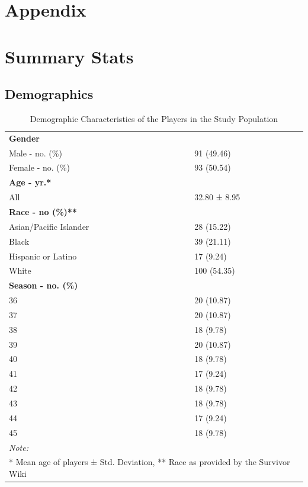 \documentclass[
  letterpaper,
  DIV=11,
  numbers=noendperiod,
  oneside]{scrartcl}
\begin{document}
\hypertarget{appendix}{%
\section{Appendix}\label{appendix}}

\hypertarget{summary-stats}{%
\section{Summary Stats}\label{summary-stats}}

\hypertarget{demographics}{%
\subsection{Demographics}\label{demographics}}

\hypertarget{tbl-summary-stats}{}
\begin{table}
\caption{\label{tbl-summary-stats}Demographic Characteristics of the Players in the Study Population }\tabularnewline

\centering
\begin{tabular}[t]{l|l}
\hline
\cellcolor{black}{\textcolor{white}{\textbf{Characteristic}}} & \cellcolor{black}{\textcolor{white}{\textbf{Value}}}\\
\hline
\textbf{Gender} & \textbf{}\\
\hline
Male - no. (\%) & 91 (49.46)\\
\hline
Female - no. (\%) & 93 (50.54)\\
\hline
\textbf{Age - yr.*} & \textbf{}\\
\hline
All & 32.80 ± 8.95\\
\hline
\textbf{Race - no (\%)**} & \textbf{}\\
\hline
Asian/Pacific Islander & 28 (15.22)\\
\hline
Black & 39 (21.11)\\
\hline
Hispanic or Latino & 17 (9.24)\\
\hline
White & 100 (54.35)\\
\hline
\textbf{Season - no. (\%)} & \textbf{}\\
\hline
36 & 20 (10.87)\\
\hline
37 & 20 (10.87)\\
\hline
38 & 18 (9.78)\\
\hline
39 & 20 (10.87)\\
\hline
40 & 18 (9.78)\\
\hline
41 & 17 (9.24)\\
\hline
42 & 18 (9.78)\\
\hline
43 & 18 (9.78)\\
\hline
44 & 17 (9.24)\\
\hline
45 & 18 (9.78)\\
\hline
\multicolumn{2}{l}{\rule{0pt}{1em}\textit{Note: }}\\
\multicolumn{2}{l}{\rule{0pt}{1em}* Mean age of players ± Std. Deviation, ** Race as provided by the Survivor Wiki}\\
\end{tabular}
\end{table}
\end{document}
